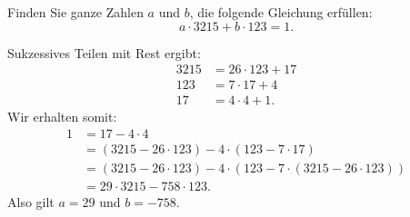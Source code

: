 %
%
%

\begin{ueb}
	Finden Sie ganze Zahlen $a$ und $b$, die folgende Gleichung erfüllen:
	\[
		a\cdot 3215 + b\cdot 123 = 1.
	\]
	\begin{lsg}
			{
				Sukzessives Teilen mit Rest ergibt:
				\begin{align*}
					3215 &= 26 \cdot 123 + 17\\
					123 &= 7 \cdot 17 + 4\\
					17 &= 4 \cdot 4 + 1.
				\end{align*}
				Wir erhalten somit:
				\begin{align*}
					1 &=  17-4\cdot 4\\
					&= (3215-26\cdot 123)-4\cdot (123-7\cdot 17)\\
					&= (3215-26\cdot 123)-4\cdot (123-7\cdot (3215-26\cdot 123))\\
					&= 29\cdot 3215-758\cdot 123.
				\end{align*}
				Also gilt $a=29$ und $b=-758$.
			}
			{~\answerspace{12cm}}
	\end{lsg}
\end{ueb}
